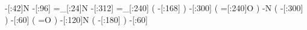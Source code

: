       -[:42]N%
      -[:96]%
     =_[:24]N%
     -[:312]%
    =_[:240]%
               (
         -[:168]\phantom{N}%
               )
     -[:300]%
               (
         =[:240]O%
               )
           -N%
               (
         -[:300]%
               )
      -[:60]%
               (
               =O%
               )
     -[:120]N%
               (
         -[:180]%
               )
      -[:60]%